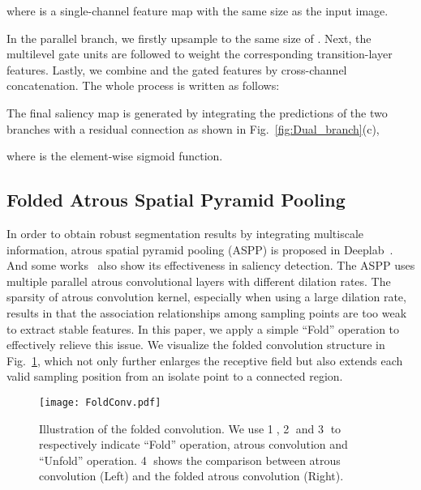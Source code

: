 \documentclass[runningheads]{llncs}
\begin{document}
	where  is a single-channel feature map with the same size as the input image. 
	
	In the parallel branch, we firstly upsample  to the same size of . Next, the multilevel gate units are followed to weight the corresponding transition-layer features. Lastly, we combine  and the gated features by cross-channel concatenation.
	The whole process is written as follows:
	
	
	The final saliency map  is generated by integrating the predictions of the two branches with a residual connection as shown in Fig.~\ref{fig:Dual_branch}(c),
	
	where  is the element-wise sigmoid function.
\subsection{Folded Atrous Spatial Pyramid Pooling}\label{sec:Fold}
	In order to obtain robust segmentation results by integrating multiscale information, atrous spatial pyramid pooling (ASPP) is proposed in Deeplab~\cite{Deeplab}. And some works~\cite{BMPM,R3Net} also show its effectiveness in saliency detection. The ASPP uses multiple  parallel  atrous  convolutional layers  with  different  dilation  rates. 
	The sparsity of atrous convolution kernel, especially when using a large dilation rate, results in that the association relationships among sampling points are too weak to extract stable features. 
	In this paper, we apply a simple ``Fold'' operation to effectively relieve this issue. We visualize the folded convolution structure in Fig.~\ref{fig:FoldConv}, which not only further enlarges the receptive field but also extends each valid sampling position from an isolate point to a  connected region.
	\begin{figure}[t]
		\centering
		\texttt{[image: FoldConv.pdf]}\\


		\caption{Illustration of the folded convolution. We use \textcircled{\scriptsize 1}, \textcircled{\scriptsize 2} and \textcircled{\scriptsize 3} to respectively indicate ``Fold'' operation, atrous convolution and ``Unfold'' operation. \textcircled{\scriptsize 4} shows the comparison between atrous convolution (Left) and the folded atrous convolution (Right).}
		\label{fig:FoldConv}
\end{figure}
	
\end{document}
